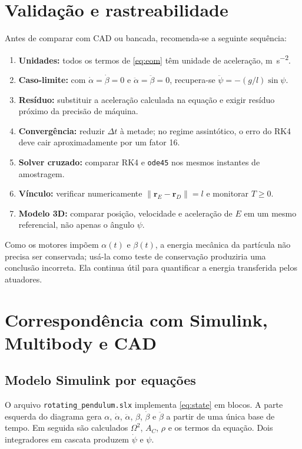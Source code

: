 \documentclass[11pt,a4paper]{article}
\newcommand{\bvec}[1]{\bm{#1}}
\begin{document}
\section{Validação e rastreabilidade}

Antes de comparar com CAD ou bancada, recomenda-se a seguinte sequência:
\begin{enumerate}
  \item \textbf{Unidades:} todos os termos de \cref{eq:eom} têm unidade de
  aceleração, \si{m.s^{-2}}.
  \item \textbf{Caso-limite:} com $\dot\alpha=\dot\beta=0$ e
  $\ddot\alpha=\ddot\beta=0$, recupera-se
  $\ddot\psi=-(g/l)\sin\psi$.
  \item \textbf{Resíduo:} substituir a aceleração calculada na equação e exigir
  resíduo próximo da precisão de máquina.
  \item \textbf{Convergência:} reduzir $\Delta t$ à metade; no regime assintótico,
  o erro do RK4 deve cair aproximadamente por um fator 16.
  \item \textbf{Solver cruzado:} comparar RK4 e \texttt{ode45} nos mesmos
  instantes de amostragem.
  \item \textbf{Vínculo:} verificar numericamente
  $\lVert\bvec r_E-\bvec r_D\rVert=l$ e monitorar $T\ge0$.
  \item \textbf{Modelo 3D:} comparar posição, velocidade e aceleração de $E$ em
  um mesmo referencial, não apenas o ângulo $\psi$.
\end{enumerate}
Como os motores impõem $\alpha(t)$ e $\beta(t)$, a energia mecânica da partícula
não precisa ser conservada; usá-la como teste de conservação produziria uma
conclusão incorreta. Ela continua útil para quantificar a energia transferida
pelos atuadores.

\section{Correspondência com Simulink, Multibody e CAD}

\subsection{Modelo Simulink por equações}

O arquivo \texttt{rotating\_pendulum.slx} implementa \cref{eq:state} em blocos.
A parte esquerda do diagrama gera $\alpha$, $\dot\alpha$, $\ddot\alpha$,
$\beta$, $\dot\beta$ e $\ddot\beta$ a partir de uma única base de tempo. Em
seguida são calculados $\Omega^2$, $A_C$, $\rho$ e os termos da equação. Dois
integradores em cascata produzem $\dot\psi$ e $\psi$.
\end{document}
